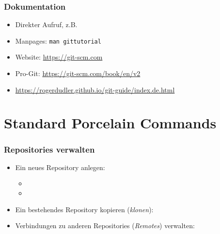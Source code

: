 \documentclass{cms-kurs}
\begin{document}
\begin{frame}
  \frametitle{Dokumentation}

  \onslide<+->

  \begin{itemize}
  \item Direkter Aufruf, z.B.{} 
  \item Manpages: \lstinline{man gittutorial}
  \item Website: \url{https://git-scm.com}
  \item Pro-Git: \url{https://git-scm.com/book/en/v2}
  \item \url{https://rogerdudler.github.io/git-guide/index.de.html}
  \end{itemize}

\end{frame}

\section{Standard Porcelain Commands}

\begin{frame}
  \frametitle{Repositories verwalten}

  \onslide<+->

  \begin{itemize}
  \item Ein neues Repository anlegen:
    \begin{itemize}
    \item {}
    \item {}
    \end{itemize}
  \item Ein bestehendes Repository kopieren (\emph{klonen}): 
  \item Verbindungen zu anderen Repositories (\emph{Remotes}) verwalten:
  \end{itemize}

\end{frame}
\end{document}

